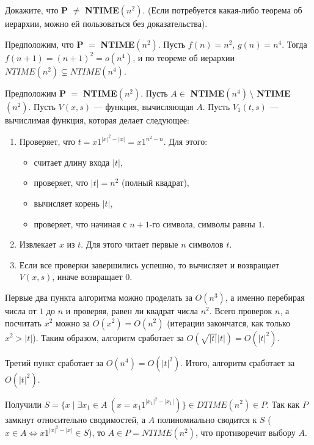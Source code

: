 Докажите, что \textbf{P} $\neq$ \textbf{NTIME}$(n^2)$. (Если потребуется какая-либо теорема об иерархии, можно ей пользоваться без доказательства).

\begin{solution}
    Предположим, что \textbf{P} $=$ \textbf{NTIME}$(n^2)$.
    Пусть $f(n) = n^2$, $g(n) = n^4$. Тогда $f(n+1) = (n+1)^2 = o(n^4)$, и по теореме об иерархии $NTIME(n^2) \subsetneq NTIME(n^4)$.

    Предположим \textbf{P} $=$ \textbf{NTIME}$(n^2)$. Пусть $A \in$ \textbf{NTIME}$(n^4) \, \setminus$ \textbf{NTIME}$(n^2)$.
    Пусть $V(x, s)$ — функция, вычисляющая $A$. Пусть $V_1(t, s)$ — вычислимая функция, которая делает следующее:
    \begin{enumerate}
        \item Проверяет, что $t = x1^{|x|^2 - |x|} = x1^{n^2 - n}$. Для этого:
              \begin{itemize}
                  \item считает длину входа $|t|$,
                  \item проверяет, что $|t| = n^2$ (полный квадрат),
                  \item вычисляет корень $|t|$,
                  \item проверяет, что начиная с $n+1$-го символа, символы равны $1$.
              \end{itemize}

        \item Извлекает $x$ из $t$. Для этого читает первые $n$ символов $t$.

        \item Если все проверки завершились успешно, то вычисляет и возвращает $V(x, s)$, иначе возвращает $0$.
    \end{enumerate}

    Первые два пункта алгоритма можно проделать за $O(n^3)$, а именно перебирая числа от $1$ до $n$ и проверяя,
    равен ли квадрат числа $n^2$. Всего проверок $n$, а посчитать $x^2$ можно за $O(x^2) = O(n^2)$
    (итерации закончатся, как только $x^2 > |t|$). Таким образом, алгоритм сработает за $O(\sqrt{|t|}|t|) = O(|t|^2)$.

    Третий пункт сработает за $O(n^4) = O(|t|^2)$. Итого, алгоритм сработает за $O(|t|^2)$.

    Получили $S = \{x \mid \exists x_1 \in A \ (x = x_1 1^{|x_1|^2 - |x_1|})\} \in DTIME(n^2) \in P$.
    Так как $P$ замкнут относительно сводимостей, а $A$ полиномиально сводится к $S$
    ($x \in A \Leftrightarrow x1^{|x|^2 - |x|} \in S$), то $A \in P = NTIME(n^2)$, что противоречит выбору $A$.

\end{solution}
